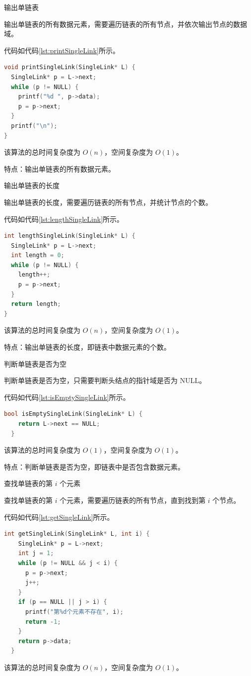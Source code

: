 \documentclass[lang=cn,newtx,10pt,scheme=chinese]{elegantbook}
\begin{document}
输出单链表

输出单链表的所有数据元素，需要遍历链表的所有节点，并依次输出节点的数据域。

代码如代码\ref{lst:printSingleLink}所示。

\begin{lstlisting}[language=C++, caption={输出单链表示例代码}, label={lst:printSingleLink}]
void printSingleLink(SingleLink* L) {
  SingleLink* p = L->next;
  while (p != NULL) {
    printf("%d ", p->data);
    p = p->next;
  }
  printf("\n");
}
\end{lstlisting}
该算法的总时间复杂度为 $O(n)$，空间复杂度为 $O(1)$。

特点：输出单链表的所有数据元素。

输出单链表的长度

输出单链表的长度，需要遍历链表的所有节点，并统计节点的个数。

代码如代码\ref{lst:lengthSingleLink}所示。

\begin{lstlisting}[language=C++, caption={输出单链表长度示例代码}, label={lst:lengthSingleLink}]
int lengthSingleLink(SingleLink* L) {
  SingleLink* p = L->next;
  int length = 0;
  while (p != NULL) {
    length++;
    p = p->next;
  }
  return length;
}
\end{lstlisting}
该算法的总时间复杂度为 $O(n)$，空间复杂度为 $O(1)$。

特点：输出单链表的长度，即链表中数据元素的个数。

判断单链表是否为空

判断单链表是否为空，只需要判断头结点的指针域是否为 NULL。

代码如代码\ref{lst:isEmptySingleLink}所示。

\begin{lstlisting}[language=C++, caption={判断单链表是否为空示例代码}, label={lst:isEmptySingleLink}]
  bool isEmptySingleLink(SingleLink* L) {
    return L->next == NULL;
  }
  \end{lstlisting}
  该算法的总时间复杂度为 $O(1)$，空间复杂度为 $O(1)$。

  特点：判断单链表是否为空，即链表中是否包含数据元素。

查找单链表的第 $i$ 个元素

查找单链表的第 $i$ 个元素，需要遍历链表的所有节点，直到找到第 $i$ 个节点。

代码如代码\ref{lst:getSingleLink}所示。

\begin{lstlisting}[language=C++, caption={查找单链表的第 $i$ 个元素示例代码}, label={lst:getSingleLink}]
  int getSingleLink(SingleLink* L, int i) {
    SingleLink* p = L->next;
    int j = 1;
    while (p != NULL && j < i) {
      p = p->next;
      j++;
    }
    if (p == NULL || j > i) {
      printf("第%d个元素不存在", i);
      return -1;
    }
    return p->data;
  }
\end{lstlisting}
该算法的总时间复杂度为 $O(n)$，空间复杂度为 $O(1)$。
\end{document}
